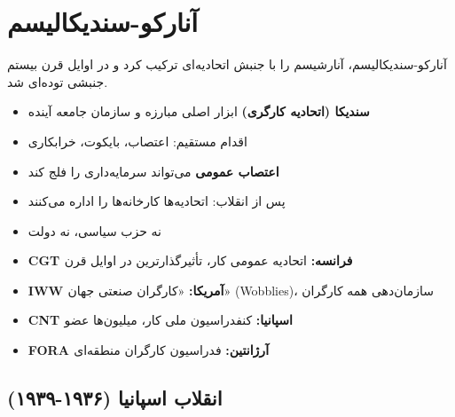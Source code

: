 \section{آنارکو-سندیکالیسم}

آنارکو-سندیکالیسم، آنارشیسم را با جنبش اتحادیه‌ای ترکیب کرد و در اوایل قرن بیستم جنبشی توده‌ای شد.

\begin{defbox}
\begin{itemize}[nosep]
    \item \textbf{سندیکا (اتحادیه کارگری)} ابزار اصلی مبارزه و سازمان جامعه آینده
    \item اقدام مستقیم: اعتصاب، بایکوت، خرابکاری
    \item \textbf{اعتصاب عمومی} می‌تواند سرمایه‌داری را فلج کند
    \item پس از انقلاب: اتحادیه‌ها کارخانه‌ها را اداره می‌کنند
    \item نه حزب سیاسی، نه دولت
\end{itemize}
\end{defbox}

\begin{historybox}
\begin{itemize}[nosep]
    \item \textbf{CGT فرانسه:} اتحادیه عمومی کار، تأثیرگذارترین در اوایل قرن
    \item \textbf{IWW آمریکا:} «کارگران صنعتی جهان» (Wobblies)، سازمان‌دهی همه کارگران
    \item \textbf{CNT اسپانیا:} کنفدراسیون ملی کار، میلیون‌ها عضو
    \item \textbf{FORA آرژانتین:} فدراسیون کارگران منطقه‌ای
\end{itemize}
\end{historybox}

\subsection{انقلاب اسپانیا (۱۹۳۶-۱۹۳۹)}

